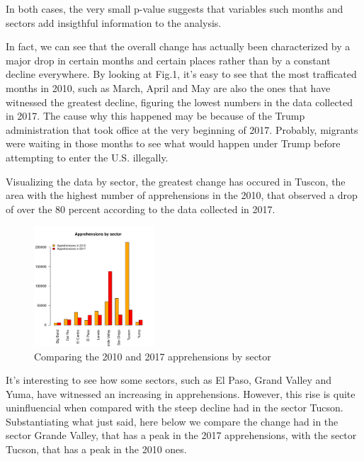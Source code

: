 \documentclass[journal, a4paper]{IEEEtran}
\begin{document}
In both cases, the very small p-value suggests that variables such months and sectors add insigthful information to the analysis.




In fact, we can see that the overall change has actually been characterized by a major drop in certain months and certain places rather than by a constant decline everywhere. By looking at Fig.1, it's easy to see that the most trafficated months in 2010, such as March, April and May are also the ones that have witnessed the greatest decline, figuring the lowest numbers in the data collected in 2017. The cause why this happened may be because of the Trump administration that took office at the very beginning of 2017. Probably, migrants were waiting in those months to see what would happen under Trump before attempting to enter the U.S. illegally.

Visualizing the data by sector, the greatest change has occured in Tuscon, the area with the highest number of apprehensions in the 2010, that observed a drop of over the 80 percent according to the data collected in 2017. 





\begin{figure}[!hbt]
\begin{center}

{

\includegraphics[width=0.4\textwidth]{pdf_template3-fig2}
\caption{Comparing the 2010 and 2017 apprehensions by sector}
}

\end{center}
\end{figure} 

It's interesting to see how some sectors, such as El Paso, Grand Valley and Yuma, have witnessed an increasing in apprehensions. However, this rise is quite uninfluencial when compared with the steep decline had in the sector Tucson. 
Substantiating what just said, here below we compare the change had in the sector Grande Valley, that has a peak in the 2017 apprehensions, with the sector Tucson, that has a peak in the 2010 ones.
\end{document}
